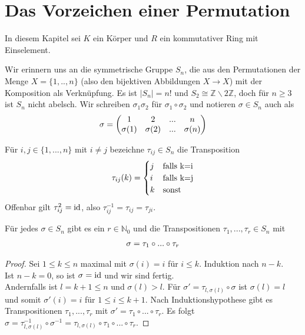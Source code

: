 \section{Das Vorzeichen einer Permutation}

In diesem Kapitel sei $K$ ein Körper und $R$ ein kommutativer Ring mit Einselement.

\begin{remark}
	Wir erinnern uns an die symmetrische Gruppe $S_n$, die aus den Permutationen der Menge $X=\{1,..,n\}$ (also den 
	bijektiven Abbildungen $X\to X$) mit der Komposition als Verknüpfung. Es ist $\vert S_n\vert =n!$ und $S_2\cong \mathbb Z\backslash 2 \mathbb Z$, 
	doch für $n\ge 3$ ist $S_n$ nicht abelsch. Wir schreiben $\sigma_1\sigma_2$ für $\sigma_1\circ \sigma_2$ und notieren $\sigma\in S_n$ 
	auch als \\
	\begin{align}
		\sigma=\begin{pmatrix}
		1 & 2 & ... & n\\
		\sigma(1) & \sigma(2) & ... & \sigma(n)\\
		\end{pmatrix}\notag
	\end{align}
\end{remark}

\begin{example}
	Für $i,j\in \{1,...,n\}$ mit $i\neq j$ bezeichne $\tau_{ij}\in S_n$ die Transposition 
	\begin{align}
	\tau_{ij}(k)=
	\begin{cases}
	j&\text{falls }$k=i$ \\ i& \text{falls }$k=j$ \\ k& \text{sonst}
	\end{cases}\notag
	\end{align} Offenbar gilt $\tau_{ij}^2=\operatorname{id}$, also $\tau_{ij}^{-1}=\tau_{ij}=\tau_{ji}$.
\end{example}

\begin{proposition}
	Für jedes $\sigma \in S_n$ gibt es ein $r\in \mathbb N_0$ und die Transpositionen $\tau_1,...,\tau_r\in S_n$ mit 
	\begin{align}
		\sigma=\tau_1\circ ... \circ \tau_r\notag
	\end{align}
\end{proposition}
\begin{proof}
	Sei $1\le k \le n$ maximal mit $\sigma(i)=i$ für $i\le k$. Induktion nach $n-k$. \\
	Ist $n-k=0$, so ist $\sigma=\operatorname{id}$ und wir sind fertig. \\
	Andernfalls ist $l=k+1\le n$ und $\sigma(l)>l$. Für $\sigma'=\tau_{l,\sigma(l)}\circ \sigma$ ist $\sigma(l)=l$ und somit $\sigma'(i)=i$ 
	für $1\le i \le k+1$. Nach Induktionshypothese gibt es Transpositionen $\tau_1,...,\tau_r$ mit $\sigma'=\tau_1\circ ...\circ \tau_r$. 
	Es folgt $\sigma=\tau_{l,\sigma(l)}^{-1}\circ \sigma^{-1}=\tau_{l,\sigma(l)}\circ \tau_1\circ ... \circ \tau_r$.
\end{proof}

